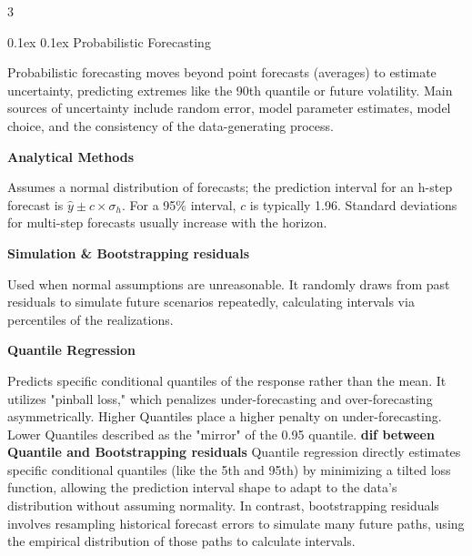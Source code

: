 \documentclass[8pt,landscape]{article}
\makeatletter
\renewcommand{\section}{\@startsection{section}{2}{0pt}%
    {0.1ex}%
    {0.1ex}%
    {\fontsize{8}{9}\bfseries\color{red}}} %
\newcommand{\smalltext}[1]{
  {\fontsize{8}{9}\selectfont\sloppy #1\par}
}
\makeatother
\begin{document}
\fontsize{8}{9}\selectfont %
\pagestyle{empty}
\begin{multicols}{3}

\section{Probabilistic Forecasting}
\smalltext{
Probabilistic forecasting moves beyond point forecasts (averages) to estimate uncertainty, predicting extremes like the 90th quantile or future volatility. Main sources of uncertainty include random error, model parameter estimates, model choice, and the consistency of the data-generating process. 
}
\textbf{Analytical Methods}
\smalltext{
Assumes a normal distribution of forecasts; the prediction interval for an h-step forecast is $\hat{y} \pm c \times \sigma_h$. For a 95\% interval, $c$ is typically 1.96. Standard deviations for multi-step forecasts usually increase with the horizon.
}
\textbf{Simulation \& Bootstrapping residuals}
\smalltext{
Used when normal assumptions are unreasonable. It randomly draws from past residuals to simulate future scenarios repeatedly, calculating intervals via percentiles of the realizations.
}

\textbf{Quantile Regression}
\smalltext{
Predicts specific conditional quantiles of the response rather than the mean. It utilizes "pinball loss," which penalizes under-forecasting and over-forecasting asymmetrically. Higher Quantiles place a higher penalty on under-forecasting. Lower Quantiles described as the "mirror" of the 0.95 quantile.
\textbf{dif between Quantile and Bootstrapping residuals}
Quantile regression directly estimates specific conditional quantiles (like the 5th and 95th) by minimizing a tilted loss function, allowing the prediction interval shape to adapt to the data's distribution without assuming normality. In contrast, bootstrapping residuals involves resampling historical forecast errors to simulate many future paths, using the empirical distribution of those paths to calculate intervals.
}


\end{multicols}
\end{document}
